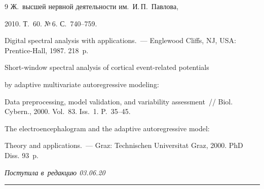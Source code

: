 {{\begin{thebibliography}{9}
Ж.~высшей нервной деятельности им.\ И.\,П.~Павлова, 


2010. Т.~60.  №\,6. С.~740--759.






Digital spectral analysis with applications.~--- Englewood Cliffs, NJ, USA: Prentice-Hall, 1987. 218~p.






Short-window spectral analysis of cortical event-related potentials 


by adaptive multivariate autoregressive modeling:


Data preprocessing, model validation, and variability assessment~/\!\!/ Biol. Cybern., 2000. Vol.~83. Iss.~1. P.~35--45.









The electroencephalogram and the adaptive autoregressive model:


 Theory and applications.~--- Graz: Technischen Universitat Graz, 2000. PhD Diss.  93~p.


\end{thebibliography}


} }








\vspace*{-3pt}





\hfill{\small\textit{Поступила в~редакцию 03.06.20}}














\vspace*{6pt}





\hrule





\vspace*{2pt}





